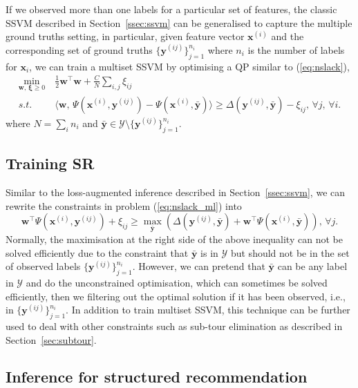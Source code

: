 If we observed more than one labels for a particular set of features, 
the classic SSVM described in Section~\ref{ssec:ssvm} can be generalised to capture the multiple ground truths setting,
in particular, given feature vector $\mathbf{x}^{(i)}$ and the corresponding set of ground truths $\{\mathbf{y}^{(ij)}\}_{j=1}^{n_i}$ 
where $n_i$ is the number of labels for $\mathbf{x}_i$,
we can train a multiset SSVM by optimising a QP similar to (\ref{eq:nslack}),
\begin{equation}
\label{eq:nslack_ml}
\begin{aligned}
\min_{\mathbf{w}, \, \bm{\xi} \ge 0} ~& \frac{1}{2} \mathbf{w}^\top \mathbf{w} + \frac{C}{N} \sum_{i,j} \xi_{ij} \\
s.t.~ ~& \langle \mathbf{w}, \, \Psi(\mathbf{x}^{(i)}, \mathbf{y}^{(ij)}) - \Psi(\mathbf{x}^{(i)}, \bar{\mathbf{y}}) \rangle \ge 
         \Delta(\mathbf{y}^{(ij)}, \bar{\mathbf{y}}) - \xi_{ij}, \, \forall j, \, \forall i.
\end{aligned}
\end{equation}
where $N = \sum_i n_i$ and $\bar{\mathbf{y}} \in \mathcal{Y} \setminus \{\mathbf{y}^{(ij)}\}_{j=1}^{n_i}$.



\subsection{Training SR}
\label{ssec:SRtrain}


Similar to the loss-augmented inference described in Section~\ref{ssec:ssvm}, 
we can rewrite the constraints in problem (\ref{eq:nslack_ml}) into
\begin{equation*}
\mathbf{w}^\top \Psi(\mathbf{x}^{(i)}, \mathbf{y}^{(ij)}) + \xi_{ij} \ge 
\max_{\bar{\mathbf{y}}} \left( \Delta(\mathbf{y}^{(ij)}, \bar{\mathbf{y}}) + \mathbf{w}^\top \Psi(\mathbf{x}^{(i)}, \bar{\mathbf{y}}) \right),
\, \forall j.
\end{equation*} 
Normally, the maximisation at the right side of the above inequality can not be solved efficiently due to the constraint that 
$\bar{\mathbf{y}}$ is in $\mathcal{Y}$ but should not be in the set of observed labels $\{\mathbf{y}^{(ij)}\}_{j=1}^{n_i}$.
However, we can pretend that $\bar{\mathbf{y}}$ can be any label in $\mathcal{Y}$ and do the unconstrained optimisation,
which can sometimes be solved efficiently, then we filtering out the optimal solution if it has been observed, 
i.e., in $\{\mathbf{y}^{(ij)}\}_{j=1}^{n_i}$. 
In addition to train multiset SSVM, this technique can be further used to deal with other constraints such as sub-tour elimination 
as described in Section~\ref{sec:subtour}.


\subsection{Inference for structured recommendation}
\label{ssec:SRinf}

